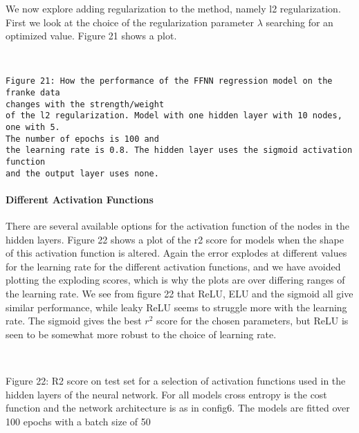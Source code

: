 \documentclass[11pt]{article}
\begin{document}
We now explore adding regularization to the method, namely l2
regularization. First we look at the choice of the regularization
parameter \(\lambda\) searching for an optimized value. Figure 21 shows
a plot.

    \begin{center}
    \end{center}
    { \hspace*{\fill} \\}
    
    \begin{Verbatim}[commandchars=\\\{\}]
Figure 21: How the performance of the FFNN regression model on the franke data
changes with the strength/weight
of the l2 regularization. Model with one hidden layer with 10 nodes, one with 5.
The number of epochs is 100 and
the learning rate is 0.8. The hidden layer uses the sigmoid activation function
and the output layer uses none.
    \end{Verbatim}

    \hypertarget{different-activation-functions}{%
\paragraph{Different Activation
Functions}\label{different-activation-functions}}

There are several available options for the activation function of the
nodes in the hidden layers. Figure 22 shows a plot of the r2 score for
models when the shape of this activation function is altered. Again the
error explodes at different values for the learning rate for the
different activation functions, and we have avoided plotting the
exploding scores, which is why the plots are over differing ranges of
the learning rate. We see from figure 22 that ReLU, ELU and the sigmoid
all give similar performance, while leaky ReLU seems to struggle more
with the learning rate. The sigmoid gives the best \(r^2\) score for the
chosen parameters, but ReLU is seen to be somewhat more robust to the
choice of learning rate.

    \begin{center}
    \end{center}
    { \hspace*{\fill} \\}
    
    Figure 22: R2 score on test set for a selection of activation functions
used in the hidden layers of the neural network. For all models cross
entropy is the cost function and the network architecture is as in
config6. The models are fitted over 100 epochs with a batch size of 50
\end{document}
